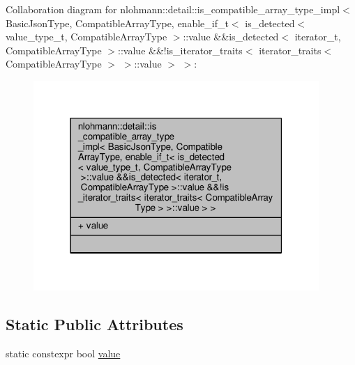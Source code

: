 Collaboration diagram for nlohmann\+:\+:detail\+:\+:is\+\_\+compatible\+\_\+array\+\_\+type\+\_\+impl$<$ Basic\+Json\+Type, Compatible\+Array\+Type, enable\+\_\+if\+\_\+t$<$ is\+\_\+detected$<$ value\+\_\+type\+\_\+t, Compatible\+Array\+Type $>$\+:\+:value \&\&is\+\_\+detected$<$ iterator\+\_\+t, Compatible\+Array\+Type $>$\+:\+:value \&\&!is\+\_\+iterator\+\_\+traits$<$ iterator\+\_\+traits$<$ Compatible\+Array\+Type $>$ $>$\+:\+:value $>$ $>$\+:
\nopagebreak
\begin{figure}[H]
\begin{center}
\leavevmode
\includegraphics[width=307pt]{structnlohmann_1_1detail_1_1is__compatible__array__type__impl_3_01BasicJsonType_00_01CompatibleA46dfba074ccbbc29093b7c90ac0749ea}
\end{center}
\end{figure}
\subsection*{Static Public Attributes}
\begin{DoxyCompactItemize}
\item 
static constexpr bool \hyperlink{structnlohmann_1_1detail_1_1is__compatible__array__type__impl_3_01BasicJsonType_00_01CompatibleAb638dd3c6149bb42b44d6778e8db3f9d_ab4a4e921f0676b2e25d1031ca486ddee}{value}
\end{DoxyCompactItemize}


